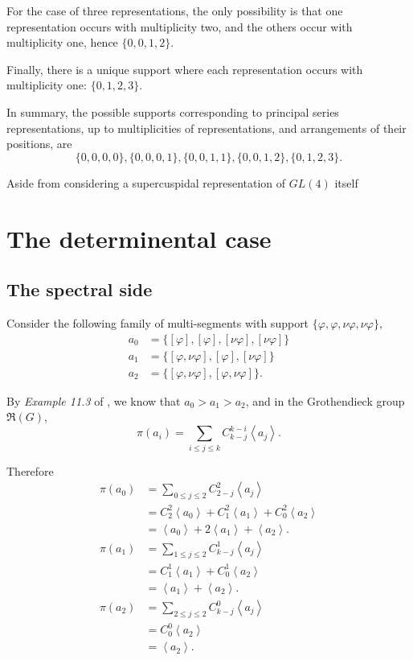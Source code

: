 \documentclass{memoir}
\newcommand{\mf}{\mathfrak}
\newcommand{\la}{\left\langle}
\newcommand{\ra}{\right\rangle}
\newcommand{\vi}{\varphi}
\theoremstyle{definition}
\begin{document}
	For the case of three representations, the only possibility is that one representation occurs with multiplicity two, and the others occur with multiplicity one, hence $\{0, 0, 1, 2\}$.  
	
	Finally, there is a unique support where each representation occurs with multiplicity one: $\{0, 1, 2, 3\}$.  
	
	In summary, the possible supports corresponding to principal series representations, up to multiplicities of representations, and arrangements of their positions, are
	$$\{0, 0, 0, 0\}, \{0, 0, 0, 1\}, \{0, 0, 1, 1\}, \{0, 0, 1, 2\}, \{0, 1, 2, 3\}.$$ 
	
	Aside from considering a supercuspidal representation of $GL(4)$ itself
	
	\section{The determinental case}
	
	\subsection{The spectral side}
	
	Consider the following family of multi-segments with support $\{\vi, \vi, \nu\vi, \nu\vi\}$,
	\begin{align*}
		a_0&=\{[\vi], [\vi], [\nu\vi], [\nu\vi]\} \\
		a_1&=\{[\vi, \nu\vi], [\vi], [\nu\vi]\} \\
		a_2&=\{[\vi, \nu\vi], [\vi, \nu\vi]\}.
	\end{align*}
	
	By \emph{Example 11.3} of \cite{ZelI2}, we know that $a_0>a_1>a_2$, and in the Grothendieck group $\mf{R}(G)$,
	$$\pi(a_i)=\sum_{i\leq j\leq k}C_{k-j}^{k-i}\la a_j\ra.$$
	
	Therefore
	\begin{align*}
		\pi(a_0)&= \sum_{0\leq j \leq 2}C_{2-j}^2\la a_j\ra\\
		&= C_2^2\la a_0\ra+C_1^2\la a_1\ra +C_0^2\la a_2\ra\\
		&=\la a_0\ra+2\la a_1\ra+\la a_2\ra.\\
		\pi(a_1)&=\sum_{1\leq j\leq 2}C_{k-j}^1\la a_j\ra\\
		&=C_1^1\la a_1\ra +C_0^1\la a_2\ra\\
		&=\la a_1\ra+\la a_2\ra.\\
		\pi(a_2)&=\sum_{2\leq j\leq 2}C_{k-j}^0\la a_j\ra\\
		&=C_0^0\la a_2\ra\\
		&=\la a_2\ra. 
	\end{align*}
	
\end{document}
